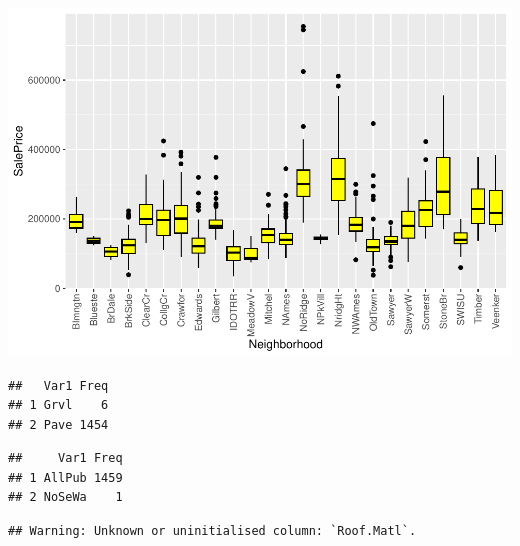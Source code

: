 \documentclass[aoas]{imsart}
\newenvironment{Shaded}{\begin{snugshade}}{\end{snugshade}}
\newcommand{\FunctionTok}[1]{\textcolor[rgb]{0.00,0.00,0.00}{#1}}
\newcommand{\NormalTok}[1]{#1}
\newcommand{\SpecialCharTok}[1]{\textcolor[rgb]{0.00,0.00,0.00}{#1}}
\numberwithin{equation}{section}
\theoremstyle{plain}
\theoremstyle{remark}
\begin{document}
\includegraphics{STAT-444-FINAL-PROJECT-PROPOSAL_files/figure-latex/unnamed-chunk-7-1.pdf}

\begin{Shaded}
\end{Shaded}

\begin{verbatim}
##   Var1 Freq
## 1 Grvl    6
## 2 Pave 1454
\end{verbatim}

\begin{Shaded}
\end{Shaded}

\begin{verbatim}
##     Var1 Freq
## 1 AllPub 1459
## 2 NoSeWa    1
\end{verbatim}

\begin{Shaded}
\end{Shaded}

\begin{verbatim}
## Warning: Unknown or uninitialised column: `Roof.Matl`.
\end{verbatim}
\end{document}
